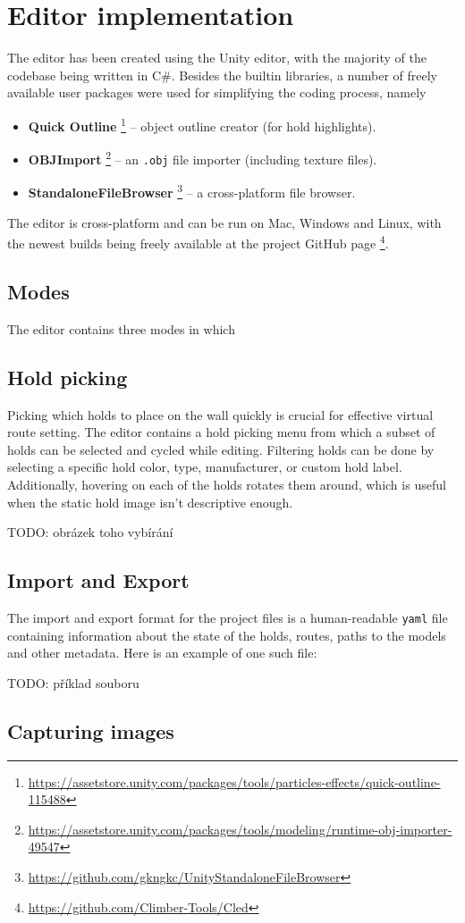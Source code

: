 \section{Editor implementation}
The editor has been created using the Unity editor, with the majority of the codebase being written in C\#.
Besides the builtin libraries, a number of freely available user packages were used for simplifying the coding process, namely

\begin{itemize}
	\item \textbf{Quick Outline} \footnote{\url{https://assetstore.unity.com/packages/tools/particles-effects/quick-outline-115488}} -- object outline creator (for hold highlights).
	\item \textbf{OBJImport} \footnote{\url{https://assetstore.unity.com/packages/tools/modeling/runtime-obj-importer-49547}} -- an \verb|.obj| file importer (including texture files).
	\item \textbf{StandaloneFileBrowser} \footnote{\url{https://github.com/gkngkc/UnityStandaloneFileBrowser}} -- a cross-platform file browser.
\end{itemize}

The editor is cross-platform and can be run on Mac, Windows and Linux, with the newest builds being freely available at the project GitHub page \footnote{\url{https://github.com/Climber-Tools/Cled}}.

\subsection{Modes}
The editor contains three modes in which 

\subsection{Hold picking}
Picking which holds to place on the wall quickly is crucial for effective virtual route setting.
The editor contains a hold picking menu from which a subset of holds can be selected and cycled while editing.
Filtering holds can be done by selecting a specific hold color, type, manufacturer, or custom hold label.
Additionally, hovering on each of the holds rotates them around, which is useful when the static hold image isn't descriptive enough.

TODO: obrázek toho vybírání


\subsection{Import and Export}
The import and export format for the project files is a human-readable \verb|yaml| file containing information about the state of the holds, routes, paths to the models and other metadata.
Here is an example of one such file:

TODO: příklad souboru

\subsection{Capturing images}

